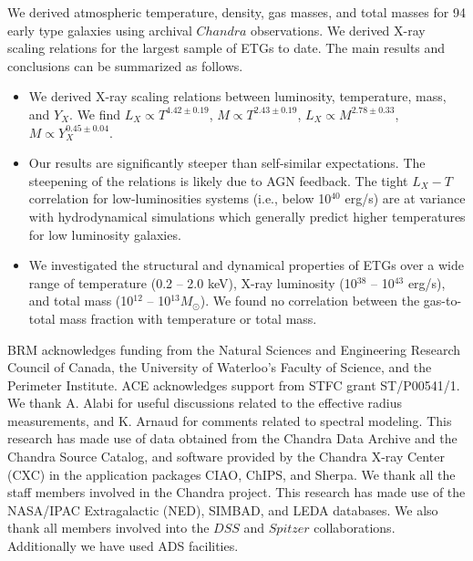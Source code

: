 \documentclass[iop]{emulateapj}
\begin{document}
We derived atmospheric temperature, density, gas masses, and total masses for 94 early type galaxies using archival $Chandra$ observations.  We derived X-ray scaling relations for the largest sample of ETGs to date.  The main results and conclusions can be summarized as follows.
\begin{itemize}
\item We derived X-ray scaling relations between luminosity, temperature, mass, and $Y_X$. We find $L_X \propto T^{4.42\pm0.19}$, $M \propto T^{2.43\pm0.19}$, $L_X \propto M^{2.78\pm0.33}$, $M \propto Y_X^{0.45\pm0.04}$. 

\item Our results are significantly steeper than self-similar expectations. The steepening of the relations is likely due to AGN feedback. The tight $L_X - T$ correlation for low-luminosities systems (i.e., below 10$^{40}$ erg/s) are at variance with hydrodynamical simulations which generally predict higher temperatures for low luminosity galaxies. 

\item We investigated the structural and dynamical properties of ETGs over a wide range of temperature (0.2 -- 2.0 keV), X-ray luminosity (10$^{38}$ -- 10$^{43}$ erg/s), and total mass (10$^{12}$ -- 10$^{13} M_{\odot}$). We found no correlation between the gas-to-total mass fraction with temperature or total mass.


\end{itemize}

\acknowledgments

BRM acknowledges funding from the Natural Sciences and Engineering Research Council of Canada, the University of Waterloo's Faculty of Science, and the Perimeter Institute. ACE acknowledges support from STFC grant ST/P00541/1.  We thank A. Alabi for useful discussions related to the effective radius measurements, and K. Arnaud for comments related to spectral modeling. This research has made use of data obtained from the Chandra Data Archive and the Chandra Source Catalog, and software provided by the Chandra X-ray Center (CXC) in the application packages CIAO, ChIPS, and Sherpa. We thank all the staff members involved in the Chandra project. This research has made use of the NASA/IPAC Extragalactic (NED), SIMBAD, and LEDA databases. We also thank all members involved into the $DSS$ and $Spitzer$ collaborations. Additionally we have used ADS facilities.



\end{document}
